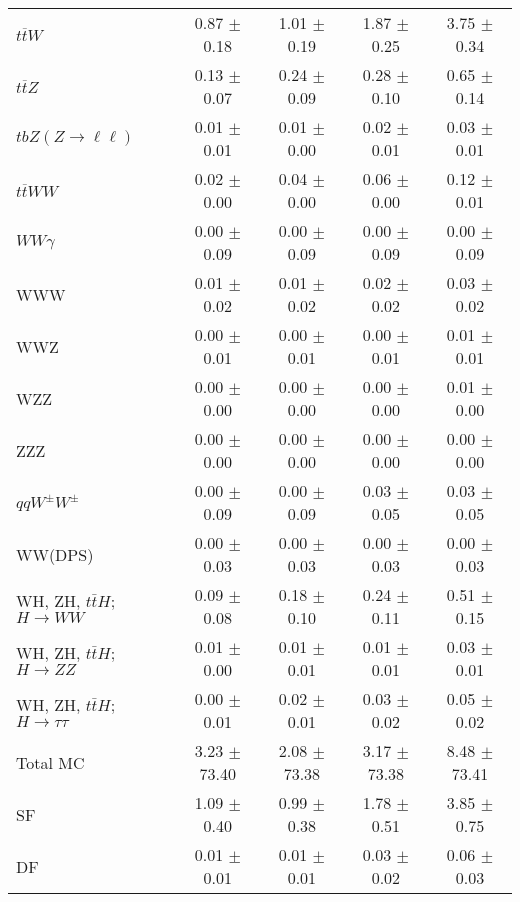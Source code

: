 \begin{tabular}{l|cccc}
                   $t\overline{t}W$ &  0.87 $\pm$  0.18 &  1.01 $\pm$  0.19 &  1.87 $\pm$  0.25 &  3.75 $\pm$  0.34 \\
                   $t\overline{t}Z$ &  0.13 $\pm$  0.07 &  0.24 $\pm$  0.09 &  0.28 $\pm$  0.10 &  0.65 $\pm$  0.14 \\
    $tbZ (Z \rightarrow \ell \ell)$ &  0.01 $\pm$  0.01 &  0.01 $\pm$  0.00 &  0.02 $\pm$  0.01 &  0.03 $\pm$  0.01 \\
                  $t\overline{t}WW$ &  0.02 $\pm$  0.00 &  0.04 $\pm$  0.00 &  0.06 $\pm$  0.00 &  0.12 $\pm$  0.01 \\
                         $WW\gamma$ &  0.00 $\pm$  0.09 &  0.00 $\pm$  0.09 &  0.00 $\pm$  0.09 &  0.00 $\pm$  0.09 \\
                                WWW &  0.01 $\pm$  0.02 &  0.01 $\pm$  0.02 &  0.02 $\pm$  0.02 &  0.03 $\pm$  0.02 \\
                                WWZ &  0.00 $\pm$  0.01 &  0.00 $\pm$  0.01 &  0.00 $\pm$  0.01 &  0.01 $\pm$  0.01 \\
                                WZZ &  0.00 $\pm$  0.00 &  0.00 $\pm$  0.00 &  0.00 $\pm$  0.00 &  0.01 $\pm$  0.00 \\
                                ZZZ &  0.00 $\pm$  0.00 &  0.00 $\pm$  0.00 &  0.00 $\pm$  0.00 &  0.00 $\pm$  0.00 \\
                 $qqW^{\pm}W^{\pm}$ &  0.00 $\pm$  0.09 &  0.00 $\pm$  0.09 &  0.03 $\pm$  0.05 &  0.03 $\pm$  0.05 \\
                            WW(DPS) &  0.00 $\pm$  0.03 &  0.00 $\pm$  0.03 &  0.00 $\pm$  0.03 &  0.00 $\pm$  0.03 \\
WH, ZH, $t\bar{t}H$; $H \rightarrow WW$ &  0.09 $\pm$  0.08 &  0.18 $\pm$  0.10 &  0.24 $\pm$  0.11 &  0.51 $\pm$  0.15 \\
WH, ZH, $t\bar{t}H$; $H \rightarrow ZZ$ &  0.01 $\pm$  0.00 &  0.01 $\pm$  0.01 &  0.01 $\pm$  0.01 &  0.03 $\pm$  0.01 \\
WH, ZH, $t\bar{t}H$; $H \rightarrow \tau\tau$ &  0.00 $\pm$  0.01 &  0.02 $\pm$  0.01 &  0.03 $\pm$  0.02 &  0.05 $\pm$  0.02 \\
\hline\hline
                           Total MC &  3.23 $\pm$ 73.40 &  2.08 $\pm$ 73.38 &  3.17 $\pm$ 73.38 &  8.48 $\pm$ 73.41 \\
\hline
                                 SF &  1.09 $\pm$  0.40 &  0.99 $\pm$  0.38 &  1.78 $\pm$  0.51 &  3.85 $\pm$  0.75 \\
                                 DF &  0.01 $\pm$  0.01 &  0.01 $\pm$  0.01 &  0.03 $\pm$  0.02 &  0.06 $\pm$  0.03 \\

\end{tabular}
